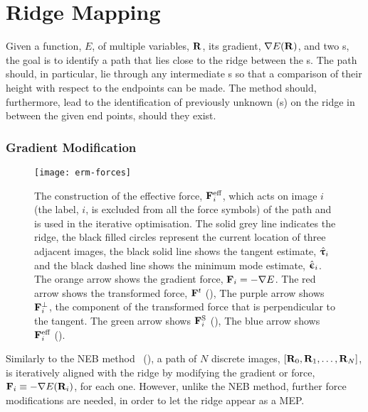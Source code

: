 \section{Ridge Mapping}
\label{sec:ridge-mapping}

Given a function, $E$, of multiple variables, ${\mathrm{\mathbf{\bm{R}}}}$, its gradient, $\nabla E({\mathrm{\mathbf{\bm{R}}}})$, and two s, the goal is to identify a path that lies close to the ridge between the s.
The path should, in particular, lie through any intermediate s so that a comparison of their height with respect to the endpoints can be made.
The method should, furthermore, lead to the identification of previously unknown (s) on the ridge in between the given end points, should they exist.

\subsubsection{Gradient Modification}
\begin{SCfigure}[5.0][h]
\centering
\texttt{[image: erm-forces]}
\caption{
The construction of the effective force, ${\mathrm{\mathbf{\bm{F}}}}^\text{eff}_i$,
which acts on image $i$ (the label, $i$, is excluded from all the force symbols) of the path and is used in the iterative optimisation.
The solid grey line indicates the ridge,
the black filled circles represent the current location of three adjacent images,
the black solid line shows the tangent estimate, $\hat{{\mathrm{\mathbf{\bm{\uptau}}}}}_i$
and the black dashed line shows the minimum mode estimate, $\hat{{\mathrm{\mathbf{\bm{\upepsilon}}}}}_i$.
The orange arrow shows the gradient force, ${\mathrm{\mathbf{\bm{F}}}}_i= -\nabla E$.
The red arrow shows the transformed force, ${\mathrm{\mathbf{\bm{F}}}}^t$ (),
The purple arrow shows ${\mathrm{\mathbf{\bm{F}}}}_i^\perp$, the component of the transformed force that is perpendicular to the tangent.
The green arrow shows ${\mathrm{\mathbf{\bm{F}}}}_i^\text{S}$ (), %
The blue arrow shows ${\mathrm{\mathbf{\bm{F}}}}_i^\text{eff}$ ().
}
\label{fig:erm-forces}
\end{SCfigure}

Similarly to the NEB method~\cite{neb-original-1998} (), a path of $N$ discrete images, $[{\mathrm{\mathbf{\bm{R}}}}_0, {\mathrm{\mathbf{\bm{R}}}}_1, \ldots, {\mathrm{\mathbf{\bm{R}}}}_N]$, is iteratively aligned with the ridge by modifying the gradient or force, ${\mathrm{\mathbf{\bm{F}}}}_i \equiv -\nabla E({\mathrm{\mathbf{\bm{R}}}}_i)$, for each one.
However, unlike the NEB method, further force modifications are needed, in order to let the ridge appear as a MEP.

